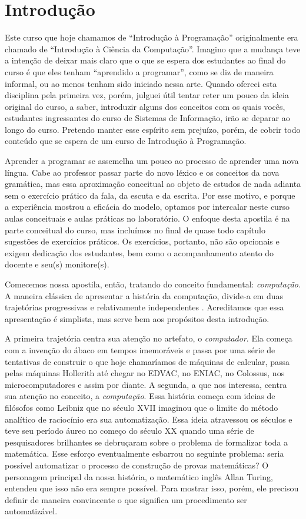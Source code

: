 \chapter{Introdução}
\label{cha:introducao}

Este curso que hoje chamamos de ``Introdução à Programação'' originalmente era chamado de ``Introdução à Ciência da Computação''.
Imagino que a mudança teve a intenção de deixar mais claro que o que se espera dos estudantes ao final do curso é que eles tenham ``aprendido a programar'', como se diz de maneira informal, ou ao menos tenham sido iniciado nessa arte.
Quando ofereci esta disciplina pela primeira vez, porém, julguei útil tentar reter um pouco da ideia original do curso, a saber, introduzir alguns dos conceitos com os quais vocês, estudantes ingressantes do curso de Sistemas de Informação, irão se deparar ao longo do curso.
Pretendo manter esse espírito sem prejuízo, porém, de cobrir todo conteúdo que se espera de um curso de Introdução à Programação.

Aprender a programar se assemelha um pouco ao processo de aprender uma nova língua.
Cabe ao professor passar parte do novo léxico e os conceitos da nova gramática, mas essa aproximação conceitual ao objeto de estudos de nada adianta sem o exercício prático da fala, da escuta e da escrita.
Por esse motivo, e porque a experiência mostrou a eficácia do modelo, optamos por intercalar neste curso aulas conceituais e aulas práticas no laboratório.
O enfoque desta apostila é na parte conceitual do curso, mas incluímos no final de quase todo capítulo sugestões de exercícios práticos.
Os exercícios, portanto, não são opcionais e exigem dedicação dos estudantes, bem como o acompanhamento atento do docente e seu(s) monitore(s).

Comecemos nossa apostila, então, tratando do conceito fundamental: {\em computação}.
A maneira clássica de apresentar a história da computação, divide-a em duas trajetórias progressivas e relativamente independentes \cite{}.
Acreditamos que essa apresentação é simplista, mas serve bem aos propósitos desta introdução.

A primeira trajetória centra sua atenção no artefato, o {\em computador}.
Ela começa com a invenção do ábaco em tempos imemoráveis e passa por uma série de tentativas de construir o que hoje chamaríamos de máquinas de calcular, passa pelas máquinas Hollerith até chegar no EDVAC, no ENIAC, no Colossus, nos microcomputadores e assim por diante.
A segunda, a que nos interessa, centra sua atenção no conceito, a {\em computação}.
Essa história começa com ideias de filósofos como Leibniz que no século XVII imaginou que o limite do método analítico de raciocínio era sua automatização.
Essa ideia atravessou os séculos e teve seu período áureo no começo do século XX quando uma série de pesquisadores brilhantes se debruçaram sobre o problema de formalizar toda a matemática.
Esse esforço eventualmente esbarrou no seguinte problema: seria possível automatizar o processo de construção de provas matemáticas?
O personagem principal da nossa história, o matemático inglês Allan Turing, entendeu que isso não era sempre possível.
Para mostrar isso, porém, ele precisou definir de maneira convincente o que significa um procedimento ser automatizável.

